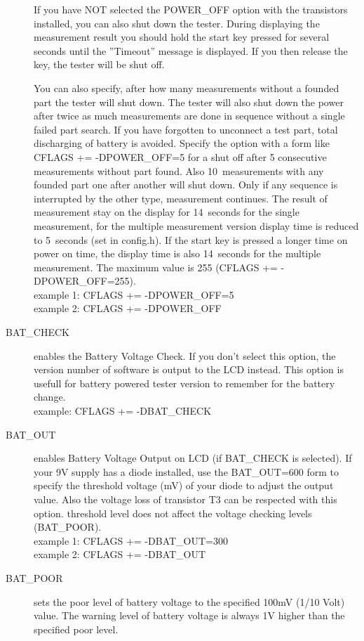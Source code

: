 \begin{description}
If you have NOT selected the POWER\_OFF option with the transistors installed,
you can also shut down the tester.
During displaying the measurement result you should hold the start key pressed for several seconds until
the ''Timeout'' message is displayed.  If you then release the key, the tester will be shut off.

You can also specify, after how many measurements without a founded part the tester will shut down.
The tester will also shut down the power after twice as much measurements are done in sequence without a
single failed part search. If you have forgotten to unconnect a test part, total discharging of battery is avoided. 
Specify the option with a form like CFLAGS += -DPOWER\_OFF=5 for a shut off after 5 consecutive measurements
without part found. Also 10~measurements with any founded part one after another will shut down.
Only if any sequence is interrupted by the other type, measurement continues.
The result of measurement stay on the display for 14~seconds for the single measurement, for the
multiple measurement version display time is reduced to 5~seconds (set in config.h).
If the start key is pressed a longer time on power on time, the display time is also 14~seconds for the multiple measurement.
The maximum value is 255 (CFLAGS += -DPOWER\_OFF=255).\\
example 1: CFLAGS += -DPOWER\_OFF=5\\
example 2: CFLAGS += -DPOWER\_OFF
  \item[BAT\_CHECK] enables the Battery Voltage Check. If you don't select this option, the version number of
software is output to the LCD instead.
This option is usefull for battery powered tester version to remember for the battery change.\\
example: CFLAGS += -DBAT\_CHECK
  \item[BAT\_OUT] enables Battery Voltage Output on LCD (if BAT\_CHECK is selected).
 If your 9V supply has a diode installed, use the BAT\_OUT=600 form to specify the threshold voltage (mV) of your diode
to adjust the output value.
Also the voltage loss of transistor T3 can be respected with this option.
 threshold level does not affect the voltage checking levels (BAT\_POOR).\\
example 1: CFLAGS += -DBAT\_OUT=300\\
example 2: CFLAGS += -DBAT\_OUT
  \item[BAT\_POOR] sets the poor level of battery voltage to the specified 100mV (1/10 Volt) value.
The warning level of battery voltage is always 1V higher than the specified poor level.

\end{description}
